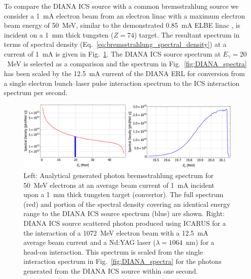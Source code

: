 \documentclass[../main.tex]{subfiles}
\begin{document}
To compare the DIANA ICS source with a common bremsstrahlung source we consider a 1~\si{\milli\ampere} electron beam from an electron linac with a maximum electron beam energy of 50~\si{\mega\electronvolt}, similar to the demonstrated 0.85~\si{\milli\ampere} ELBE linac \cite{teichert2003results}, is incident on a 1~\si{\milli\meter} thick tungsten ($Z = 74$) target. The resultant spectrum in terms of spectral density (Eq.~\ref{eq:bremsstrahlung_spectral_density}) at a current of 1~\si{\milli\ampere} is given in Fig.~\ref{fig:brem_1mA_DIANA_ICS_comparison}. The DIANA ICS source spectrum at $E_{\gamma} = 20$~\si{\mega\electronvolt} is selected as a comparison and the spectrum in Fig.~\ref{fig:DIANA_spectra} has been scaled by the 12.5~\si{\milli\ampere} current of the DIANA ERL for conversion from a single electron bunch--laser pulse interaction spectrum to the ICS interaction spectrum per second.
\begin{figure}[!h]
\centering
\includegraphics[width=\textwidth]{Figures/DIANA_Inverse_Compton_Source_Design/Brem_1mA_DIANA_ICS_Comparison.pdf}
\caption{Left: Analytical generated photon bremsstrahlung spectrum for 50~\si{\mega\electronvolt} electrons at an average beam current of 1~\si{\milli\ampere} incident upon a 1~\si{\milli\meter} thick tungsten target (convertor). The full spectrum (red) and portion of the spectral density covering an identical energy range to the DIANA ICS source spectrum (blue) are shown. Right: DIANA ICS source scattered photon produced using \textsc{ICARUS} for a the interaction of a 1072~\si{\mega\electronvolt} electron beam with a 12.5~\si{\milli\ampere} average beam current and a Nd:YAG laser ($\lambda=1064$~\si{\nano\meter}) for a head-on interaction. This spectrum is scaled from the single interaction spectrum in Fig.~\ref{fig:DIANA_spectra} for the photons generated from the DIANA ICS source within one second.}
\label{fig:brem_1mA_DIANA_ICS_comparison}
\end{figure}
\end{document}
